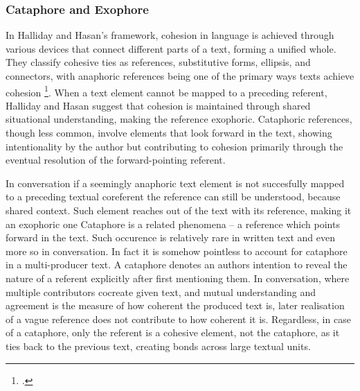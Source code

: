 \documentclass[12pt]{report}
\begin{document}
{\subsubsection{Cataphore and Exophore}
\par
    In Halliday and Hasan's framework,
    cohesion in language is achieved through various devices that connect
    different parts of a text, forming a unified whole.
    They classify cohesive ties as
    references, substitutive forms, ellipsis, and connectors, with
    anaphoric references being one of the primary ways texts achieve cohesion \footcite[p.~68]{Halliday76cohesion}.
    When a text element cannot be mapped to a preceding referent,
    Halliday and Hasan suggest that cohesion is maintained through
    shared situational understanding, making the reference exophoric.
    Cataphoric references, though less common, involve
    elements that look forward in the text,
    showing intentionality by the author but contributing to
    cohesion primarily through the eventual resolution of the forward-pointing referent.

\par
    In conversation if a seemingly anaphoric text element is not succesfully mapped
    to a preceding textual coreferent
    the reference can still be understood, because shared context.
    Such element reaches out of the text with its reference, making it an exophoric one
    Cataphore is a related phenomena –
    a reference which points forward in the text.
    Such occurence is relatively rare in written text and even more so in conversation.
    In fact it is somehow pointless to account for cataphore in a multi-producer text.
    A cataphore denotes an authors intention to reveal
    the nature of a referent explicitly after first mentioning them.
    In conversation, where multiple contributors cocreate given text,
    and mutual understanding and agreement is the measure of
    how coherent the produced text is, later realisation of a vague reference
    does not contribute to how coherent it is.
    Regardless, in case of a cataphore,
    only the referent is a cohesive element,
    not the cataphore,
    as it ties back to the previous text, creating bonds across large textual units.

}
\end{document}
